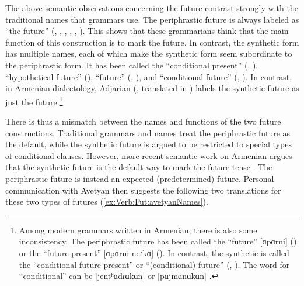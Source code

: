 The above semantic observations concerning the future contrast strongly with  the traditional names that grammars use. The periphrastic future is always labeled as “the future” (\citealt[182]{Minassian-1980-EastArmenianGrammar}, \citealt[209]{fairbanksStevick-1975-spokenEastArmenian}, \citealt[71]{BardakjianVaux-1999-easternArmeniantextbook}, \citealt[94]{Hagopian-2007-ArmenianTextbookEveryone}, \citealt[124]{Sakayan-2007-TextbookEasternArmenian}, \citealt[233]{DumTragut-2009-ArmenianReferenceGrammar}). This shows that these grammarians think that the main function of this construction is to mark the future. In contrast, the synthetic form has multiple names, each of which make the synthetic form seem subordinate to the periphrastic form. It has been called the “conditional present” (\citealt[192]{Minassian-1980-EastArmenianGrammar}, \citealt[160]{Hagopian-2007-ArmenianTextbookEveryone}), “hypothetical future” (\citealt[224]{Sakayan-2007-TextbookEasternArmenian}), “future” (\citealt[85]{Johnson-1954-EastArmGrammar}, \citealt[93]{fairbanksStevick-1975-spokenEastArmenian}), and “conditional future” (\citealt[196]{BardakjianVaux-1999-easternArmeniantextbook}, \citealt[253]{DumTragut-2009-ArmenianReferenceGrammar}). In contrast, in Armenian dialectology, Adjarian (\citealt{Adjarian-1911-DialectologyBook}, translated in \citealt{Dolatian-prep-Adjarian}) labels the synthetic future as just the future.\footnote{Among modern grammars written in Armenian, there is also some inconsistency. The periphrastic future has been called the “future” [ɑpɑrni]  (\citealt[292]{Ezekyan-2007-Armenian}) or the “future present” [ɑpɑrni neɾkɑ]  (\citealt[295]{Sevak-2009-Coursebook}). In contrast,  the synthetic is called the “conditional future present” or “(conditional) future” (\citealt[292]{Ezekyan-2007-Armenian}, \citealt[295]{Sevak-2009-Coursebook}). The word for “conditional” can be [jentʰɑdɾɑkɑn]  or [pɑjmɑnɑkɑn] .}


There is thus a  mismatch between the names and functions of the two future constructions. Traditional grammars and names treat the periphrastic future as the default, while the synthetic future is argued to be restricted to special types of conditional clauses. However, more recent semantic work on Armenian argues that the synthetic future is the default way to mark the future tense \citep{avetyan-2022-Future}. The periphrastic future is instead an expected (predetermined) future. Personal communication with Avetyan   \citep{avetyan-2022-Future} then suggests the following two translations for these two types of futures (\ref{ex:Verb:Fut:avetyanNames}). 

